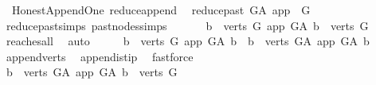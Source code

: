 \begin{isabellebody}
\endisatagproof
{\isafoldproof}%
%
\isadelimproof
\isanewline
%
\endisadelimproof
\isanewline
{}\isamarkupfalse%
\ {\isacharparenleft}{\kern0pt}\ Honest{\isacharunderscore}{\kern0pt}Append{\isacharunderscore}{\kern0pt}One{\isacharparenright}{\kern0pt}\ reduce{\isacharunderscore}{\kern0pt}append{\isacharcolon}{\kern0pt}\isanewline
\ \ {\isachardoublequoteopen}reduce{\isacharunderscore}{\kern0pt}past\ G{\isacharunderscore}{\kern0pt}A\ app\ {\isacharequal}{\kern0pt}\ G{\isachardoublequoteclose}\isanewline
%
\isadelimproof
\ \ %
\endisadelimproof
%
\isatagproof
{}\isamarkupfalse%
\ reduce{\isacharunderscore}{\kern0pt}past{\isachardot}{\kern0pt}simps\ past{\isacharunderscore}{\kern0pt}nodes{\isachardot}{\kern0pt}simps\ \isanewline
{}\isamarkupfalse%
\ {\isacharminus}{\kern0pt}\isanewline
\ \ \isamarkupfalse%
\ {\isachardoublequoteopen}{\isacharbraceleft}{\kern0pt}b\ {\isasymin}\ verts\ G{\isachardot}{\kern0pt}\ app\ {\isasymrightarrow}\isactrlsup {\isacharplus}{\kern0pt}\isactrlbsub G{\isacharunderscore}{\kern0pt}A\isactrlesub \ b{\isacharbraceright}{\kern0pt}\ {\isacharequal}{\kern0pt}\ verts\ G{\isachardoublequoteclose}\isanewline
\ \ \ \ \isamarkupfalse%
\ reaches{\isacharunderscore}{\kern0pt}all\ \isamarkupfalse%
\ auto\isanewline
\ \ \isamarkupfalse%
\ \isamarkupfalse%
\ {\isachardoublequoteopen}{\isacharbraceleft}{\kern0pt}b\ {\isasymin}\ verts\ G{\isachardot}{\kern0pt}\ app\ {\isasymrightarrow}\isactrlsup {\isacharplus}{\kern0pt}\isactrlbsub G{\isacharunderscore}{\kern0pt}A\isactrlesub \ b{\isacharbraceright}{\kern0pt}\ {\isacharequal}{\kern0pt}\ {\isacharbraceleft}{\kern0pt}b\ {\isasymin}\ verts\ G{\isacharunderscore}{\kern0pt}A{\isachardot}{\kern0pt}\ app\ {\isasymrightarrow}\isactrlsup {\isacharplus}{\kern0pt}\isactrlbsub G{\isacharunderscore}{\kern0pt}A\isactrlesub \ b{\isacharbraceright}{\kern0pt}{\isachardoublequoteclose}\isanewline
\ \ \ \ \isamarkupfalse%
\ append{\isacharunderscore}{\kern0pt}verts\ \isamarkupfalse%
\ append{\isacharunderscore}{\kern0pt}is{\isacharunderscore}{\kern0pt}tip\ \isamarkupfalse%
\ fastforce\isanewline
\ \ \isamarkupfalse%
\ \isamarkupfalse%
\ {\isachardoublequoteopen}{\isacharbraceleft}{\kern0pt}b\ {\isasymin}\ verts\ G{\isacharunderscore}{\kern0pt}A{\isachardot}{\kern0pt}\ app\ {\isasymrightarrow}\isactrlsup {\isacharplus}{\kern0pt}\isactrlbsub G{\isacharunderscore}{\kern0pt}A\isactrlesub \ b{\isacharbraceright}{\kern0pt}\ {\isacharequal}{\kern0pt}\ verts\ G{\isachardoublequoteclose}\ \isamarkupfalse%

\end{isabellebody}

